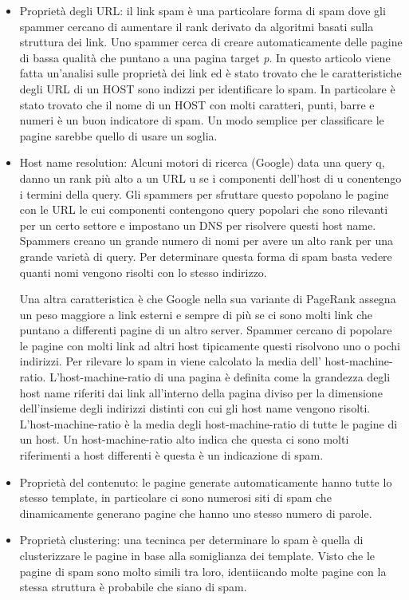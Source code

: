 \begin{itemize}
 \item 	Proprietà degli URL: il link spam è una particolare forma di spam dove gli spammer cercano di aumentare il rank derivato da algoritmi basati sulla struttura dei link. Uno spammer cerca di creare automaticamente delle pagine di bassa qualità che puntano a una pagina target \textit{p}. In questo articolo viene fatta un'analisi sulle proprietà dei link ed è stato trovato che le caratteristiche degli URL di un HOST sono indizzi per identificare lo spam. In particolare è stato trovato che il nome di un HOST con molti caratteri, punti, barre e numeri è un buon indicatore di spam. Un modo semplice per classificare le pagine sarebbe quello di usare un soglia. %
 \item Host name resolution: Alcuni motori di ricerca (Google) data una query q, danno un rank più alto a un URL u se i componenti dell'host di u conentengo i termini della query. Gli spammers per sfruttare questo popolano le pagine con le URL le cui componenti contengono query popolari che sono rilevanti per un certo settore e impostano un DNS per risolvere questi host name. Spammers creano un grande numero di nomi per avere un alto rank per una grande varietà di query. Per determinare questa forma di spam basta vedere quanti nomi vengono risolti con lo stesso indirizzo.


Una altra caratteristica è che Google nella sua variante di PageRank assegna un peso maggiore a link esterni e sempre di più se ci sono molti link che puntano a differenti pagine di un altro server. Spammer cercano di popolare le pagine con molti link ad altri host tipicamente questi risolvono uno o pochi indirizzi. Per rilevare lo spam in viene calcolato la media dell' host-machine-ratio. L'host-machine-ratio di una pagina è definita come la grandezza degli host name riferiti dai link all'interno della pagina diviso per la dimensione dell'insieme degli indirizzi distinti con cui gli host name vengono risolti. L'host-machine-ratio è la media degli host-machine-ratio di tutte le pagine di un host. Un host-machine-ratio alto indica che questa ci sono molti riferimenti a host differenti è questa è un indicazione di spam.
 \item Proprietà del contenuto: le pagine generate automaticamente hanno tutte lo stesso template, in particolare ci sono numerosi siti di spam che dinamicamente generano pagine che hanno uno stesso numero di parole.
 \item Proprietà clustering: una tecninca per determinare lo spam è quella di clusterizzare le pagine in base alla somiglianza dei template. Visto che le pagine di spam sono molto simili tra loro, identiicando molte pagine con la stessa struttura è probabile che siano di spam.
\end{itemize}
